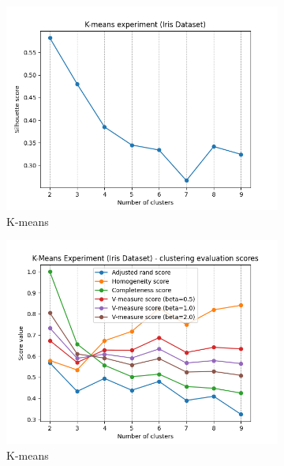 \documentclass[12pt]{article}
\begin{document}
\begin{figure}[H]
    \centering
    \begin{subfigure}[t]{0.19\textwidth}
        \includegraphics[width=\linewidth]{img/other_datasets/iris_kmeans_silhouette.png}
        \caption{K-means}
    \end{subfigure}
    \hfill
    \begin{subfigure}[t]{0.19\textwidth}
        \includegraphics[width=\linewidth]{img/other_datasets/iris_kmeans_scores.png}
        \caption{K-means}
    \end{subfigure}
    \hfill
    \begin{subfigure}[t]{0.19\textwidth}

\end{subfigure}
\end{figure}
\end{document}
